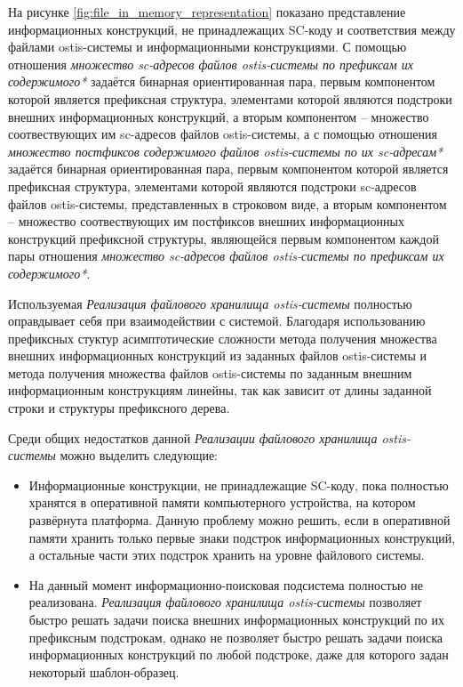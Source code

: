 На рисунке \ref{fig:file_in_memory_representation} показано представление информационных конструкций, не принадлежащих SC-коду и соответствия между файлами ostis-системы и информационными конструкциями. С помощью отношения \textit{множество sc-адресов файлов ostis-системы по префиксам их содержимого*} задаётся бинарная ориентированная пара, первым компонентом которой является префиксная структура, элементами которой являются подстроки внешних информационных конструкций, а вторым компонентом -- множество соотвествующих им sc-адресов файлов ostis-системы, а с помощью отношения \textit{множество постфиксов содержимого файлов ostis-системы по их sc-адресам*} задаётся бинарная ориентированная пара, первым компонентом которой является префиксная структура, элементами которой являются подстроки sc-адресов файлов ostis-системы, представленных в строковом виде, а вторым компонентом -- множество соотвествующих им постфиксов внешних информационных конструкций префиксной структуры, являющейся первым компонентом каждой пары отношения \textit{множество sc-адресов файлов ostis-системы по префиксам их содержимого*}.

Используемая \textit{Реализация файлового хранилища ostis-системы} полностью оправдывает себя при взаимодействии с системой. Благодаря использованию префиксных стуктур асимптотические сложности метода получения множества внешних информационных конструкций из заданных файлов ostis-системы и метода получения множества файлов ostis-системы по заданным внешним информационным конструкциям линейны, так как зависит от длины заданной строки и структуры префиксного дерева.

Среди общих недостатков данной \textit{Реализации файлового хранилища ostis-системы} можно выделить следующие:
\begin{itemize}
    \item Информационные конструкции, не принадлежащие SC-коду, пока полностью хранятся в оперативной памяти компьютерного устройства, на котором развёрнута платформа. Данную проблему можно решить, если в оперативной памяти хранить только первые знаки подстрок информационных конструкций, а остальные части этих подстрок хранить на уровне файлового системы.
    \item На данный момент информационно-поисковая подсистема полностью не реализована. \textit{Реализация файлового хранилища ostis-системы} позволяет быстро решать задачи поиска внешних информационных конструкций по их префиксным подстрокам, однако не позволяет быстро решать задачи поиска информационных конструкций по любой подстроке, даже для которого задан некоторый шаблон-образец.
\end{itemize}

